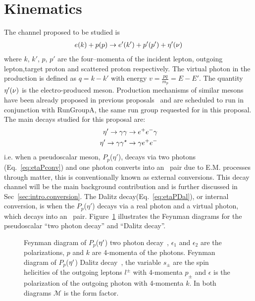 \section{Kinematics}\label{sec:kinematics}
The channel proposed to be studied is 
\begin{align}
e(k)+p(p)\to e'(k') + p'(p') +\eta^{\prime}(\nu) \label{eq:etaP} 
\end{align}
where $k$, $k'$, $p$, $p'$ are the four–momenta of the incident lepton, outgoing lepton,target proton and scattered proton respectively. The virtual photon in the production is defined as $q=k-k'$ with energy $v = \frac{pq}{m_p} = E - E'$. The quantity $\eta^{\prime}(\nu)$ is the electro-produced meson. Production mechanisms of similar mesons have been already proposed in previous proposals~\cite{clas.proposal.eta,clas.proposal.phi} and are scheduled to run in conjunction with RunGroupA, the same run group requested for in this proposal.
The main decays studied for this proposal are:
\begin{align}
\eta^{\prime} \rightarrow \gamma \gamma \to e^+e^- \gamma \label{eq:etaPconv} \\
\eta^{\prime} \rightarrow \gamma \gamma^\star \to \gamma e^+e^- \label{eq:etaPDal} 
\end{align}
i.e. when a pseudoscalar meson, $P_p$($\eta'$), decays via two photons (Eq.~\ref{eq:etaPconv}) and one photon converts into an \epemT \ pair due to E.M. processes through matter, this is conventionally known as external conversions. This decay channel will be the main background contribution and is further discussed in Sec~\ref{sec:intro.conversion}. The Dalitz decay(Eq.~\ref{eq:etaPDal}), or internal conversion, is when the $P_p$($\eta'$) decays via a real photon and a virtual photon, which decays into an \epemT \ pair.
Figure~\ref{fig:piz.alldecay} illustrates the Feynman diagrams for the pseudoscalar ``two photon decay'' and  ``Dalitz decay''.
 \begin{figure}[h!]\begin{center}
 		\quad
 		\caption[Feynman diagram of $P_p$($\etaP$) two photon decay and Dalitz decay]{\label{fig:piz.alldecay}Feynman diagram of $P_p$($\etaP$) two photon decay~, $\epsilon_1$ and $\epsilon_2$ are the polarizations, $p$ and $k$ are 4-momenta of the photons.  Feynman diagram of $P_p$($\etaP$) Dalitz decay~, the variable $s_\pm$ are the spin helicities of the outgoing leptons $l^\pm$ with 4-momenta $p_{\pm}$ and $\epsilon$ is the polarization of the outgoing photon with 4-momenta $k$. In both diagrams $\mathcal{M}$ is the form factor.}
\end{center}\end{figure}
